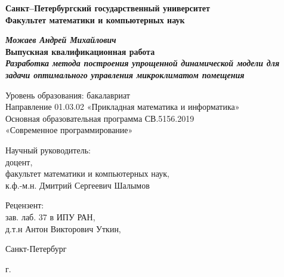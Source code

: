 \begin{titlepage}
\begin{center}

\textbf{Санкт--Петербургский государственный университет}\\
\textbf{Факультет математики и компьютерных наук}


\vspace{35mm}

\textbf{\textit{\large Можаев Андрей Михайлович}} \\[8mm]
\textbf{\large Выпускная квалификационная работа}\\[3mm]
\textbf{\textit{\large Разработка метода построения упрощенной динамической модели для задачи оптимального управления микроклиматом помещения}}

\vspace{20mm}
Уровень образования: бакалавриат\\
Направление 01.03.02 «Прикладная математика и информатика»\\
Основная образовательная программа СВ.5156.2019\\
«Современное программирование»\\[25mm]


\begin{flushright}
\begin{minipage}[t]{0.65\textwidth}
{Научный руководитель:} \\
доцент,\\
факультет математики и компьютерных наук,\\
к.ф.-м.н. Дмитрий Сергеевич Шалымов
\vspace{10mm}

{Рецензент:} \\
зав. лаб. 37 в ИПУ РАН,\\
д.т.н Антон Викторович Уткин, 
\end{minipage}
\end{flushright}

\vfill

{Санкт-Петербург}
\par{\the\year{} г.}
\end{center}
\end{titlepage}
\restoregeometry
\addtocounter{page}{1}
